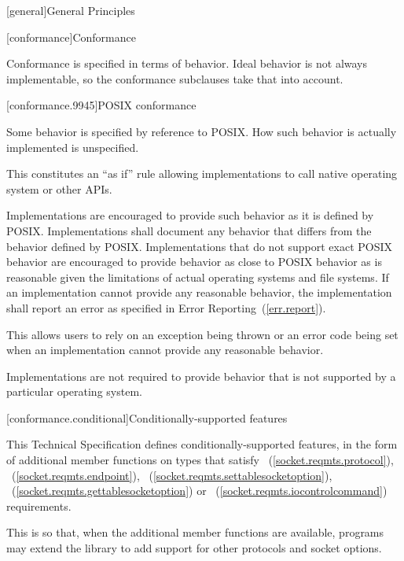 
[general]{General Principles}

[conformance]{Conformance}

\pnum
 Conformance is specified in terms of behavior. Ideal behavior is not always implementable, so the conformance subclauses take that into account.


[conformance.9945]{POSIX conformance}

\pnum
 Some behavior is specified by reference to POSIX. How such behavior is actually implemented is unspecified.

\pnum
 \begin{note} This constitutes an ``as if'' rule allowing implementations to call native operating system or other APIs. \end{note}

\pnum
Implementations are encouraged to provide such behavior as it is defined by POSIX. Implementations shall document any behavior that differs from the behavior defined by POSIX. Implementations that do not support exact POSIX behavior are encouraged to provide behavior as close to POSIX behavior as is reasonable given the limitations of actual operating systems and file systems. If an implementation cannot provide any reasonable behavior, the implementation shall report an error as specified in Error Reporting~(\ref{err.report}).

\pnum
 \begin{note} This allows users to rely on an exception being thrown or an error code being set when an implementation cannot provide any reasonable behavior. \end{note}

\pnum
 Implementations are not required to provide behavior that is not supported by a particular operating system.



[conformance.conditional]{Conditionally-supported features}

\pnum
This Technical Specification defines conditionally-supported features, in the form of additional member functions on types that satisfy ~(\ref{socket.reqmts.protocol}), ~(\ref{socket.reqmts.endpoint}), ~(\ref{socket.reqmts.settablesocketoption}), ~(\ref{socket.reqmts.gettablesocketoption}) or ~(\ref{socket.reqmts.iocontrolcommand}) requirements.

\pnum
 \begin{note} This is so that, when the additional member functions are available, \Cpp programs may extend the library to add support for other protocols and socket options. \end{note}

